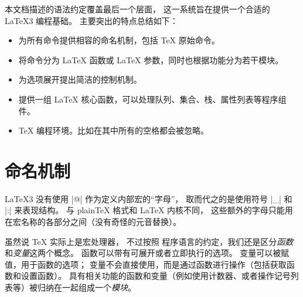\documentclass{l3doc}
\begin{document}
本文档描述的语法约定覆盖最后一个层面，
这一系统旨在提供一个合适的 \LaTeX3 编程基础。
主要突出的特点总结如下：
\begin{itemize}
\item 为所有命令提供相容的命名机制，包括 \TeX{} 原始命令。
\item 将命令分为 \LaTeX{} 函数或 \LaTeX{} 参数，同时也根据功能分为若干模块。
\item 为选项展开提出简洁的控制机制。
\item 提供一组 \LaTeX{} 核心函数，可以处理队列、集合、栈、属性列表等程序组件。
\item \TeX{} 编程环境。比如在其中所有的空格都会被忽略。
\end{itemize}

%
\section{命名机制}
%

\LaTeX3 没有使用 |@| 作为定义内部宏的“字母”，
取而代之的是使用符号 |_| 和 |:| 来表现结构。
与 plain\TeX{} 格式和 \LaTeX{} 内核不同，
这些额外的字母只能用在宏名称的各部分之间（没有奇怪的元音替换）。

%
%
虽然说 \TeX{} 实际上是宏处理器，
不过按照  程序语言的约定，我们还是区分\emph{函数}和\emph{变量}这两个概念。
函数可以带有可展开或者立即执行的选项。
变量可以被赋值，用于函数的选项；
变量不会直接使用，而是通过函数进行操作（包括获取函数和设置函数）。
具有相关功能的函数和变量（例如使用计数器、或者操作记号列表等）被归纳在一起组成一个\emph{模块}。
\end{document}
